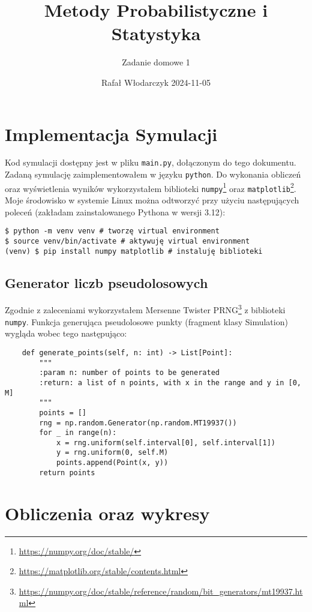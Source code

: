 \documentclass{article}
\title{Metody Probabilistyczne i Statystyka}
\author{Zadanie domowe 1}
\date{Rafał Włodarczyk 2024-11-05}
\begin{document}
\maketitle

\tableofcontents

\section{Implementacja Symulacji}

Kod symulacji dostępny jest w pliku \texttt{main.py}, dołączonym do tego dokumentu.\\
Zadaną symulację zaimplementowałem w języku \texttt{python}.
Do wykonania obliczeń oraz wyświetlenia wyników wykorzystałem biblioteki
\texttt{numpy}\footnote{\url{https://numpy.org/doc/stable/}} oraz \texttt{matplotlib}\footnote{\url{https://matplotlib.org/stable/contents.html}}.
Moje środowisko w systemie Linux można odtworzyć przy użyciu następujących poleceń (zakładam zainstalowanego Pythona w wersji 3.12):

\begin{verbatim}
$ python -m venv venv # tworzę virtual environment
$ source venv/bin/activate # aktywuję virtual environment
(venv) $ pip install numpy matplotlib # instaluję biblioteki
\end{verbatim}

\subsection{Generator liczb pseudolosowych}

Zgodnie z zaleceniami wykorzystałem Mersenne Twister PRNG\footnote{\url{https://numpy.org/doc/stable/reference/random/bit_generators/mt19937.html}} z biblioteki \texttt{numpy}. Funkcja generująca pseudolosowe punkty (fragment klasy Simulation) wygląda wobec tego następująco:

\begin{verbatim}
    def generate_points(self, n: int) -> List[Point]:
        """
        :param n: number of points to be generated
        :return: a list of n points, with x in the range and y in [0, M]
        """
        points = []
        rng = np.random.Generator(np.random.MT19937())
        for _ in range(n):
            x = rng.uniform(self.interval[0], self.interval[1])
            y = rng.uniform(0, self.M)
            points.append(Point(x, y))
        return points
\end{verbatim}

\section{Obliczenia oraz wykresy}
\end{document}
